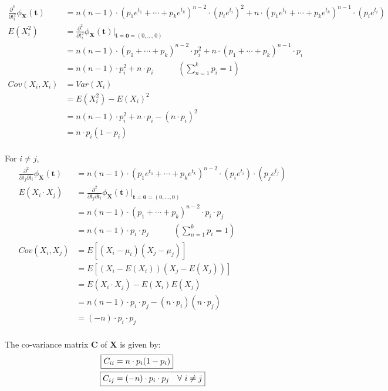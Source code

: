 \documentclass[11pt, fleqn]{article}
\begin{document}
\begin{equation*}
    \begin{split}
        \frac{\partial^2}{\partial t_i^2} \phi_{\mathbf{X}}(\mathbf{t}) &= n(n-1) \cdot (p_1 e^{t_1} + \cdots + p_k e^{t_k})^{n-2} \cdot (p_i e^{t_i})^2 + n \cdot (p_1 e^{t_1} + \cdots + p_k e^{t_k})^{n-1} \cdot (p_i e^{t_i}) \\
        E(X_i^2) &= \frac{\partial^2}{\partial t_i^2} \phi_{\mathbf{X}}(\mathbf{t}) \bigg\rvert_{\mathbf{t} = \mathbf{0} = (0, \dots, 0)} \\
            &= n(n-1) \cdot (p_1 + \cdots + p_k)^{n-2} \cdot p_i^2 + n \cdot (p_1 + \cdots + p_k)^{n-1} \cdot p_i \\
            &= n(n-1) \cdot p_i^2 + n \cdot p_i \hspace{3em} (\sum_{n=1}^{k} p_i = 1) \\
        Cov(X_i, X_i) &= Var(X_i) \\
            &= E(X_i^2) - E(X_i)^2 \\
            &= n(n-1) \cdot p_i^2 + n \cdot p_i - (n \cdot p_i)^2 \\
            &= n \cdot p_i (1 - p_i) \\
    \end{split}
\end{equation*}

For $i \ne j$,
\begin{equation*}
    \begin{split}
        \frac{\partial^2}{\partial t_j \partial t_i} \phi_{\mathbf{X}}(\mathbf{t}) &= n(n-1) \cdot (p_1 e^{t_1} + \cdots + p_k e^{t_k})^{n-2} \cdot (p_i e^{t_i}) \cdot (p_j e^{t_j}) \\
        E(X_i \cdot X_j) &= \frac{\partial^2}{\partial t_j \partial t_i} \phi_{\mathbf{X}}(\mathbf{t}) \bigg\rvert_{\mathbf{t} = \mathbf{0} = (0, \dots, 0)} \\
            &= n(n-1) \cdot (p_1 + \cdots + p_k)^{n-2} \cdot p_i \cdot p_j \\
            &= n(n-1) \cdot p_i  \cdot p_j \hspace{3em} (\sum_{n=1}^{k} p_i = 1) \\
        Cov(X_i, X_j) &= E[(X_i - \mu_i)(X_j - \mu_j)] \\
            &= E[(X_i - E(X_i))(X_j - E(X_j))] \\
            &= E(X_i \cdot X_j) - E(X_i)E(X_j) \\
            &= n(n-1) \cdot p_i  \cdot p_j - (n \cdot p_i)(n \cdot p_j) \\
            &= (-n) \cdot p_i \cdot p_j  \\
    \end{split}
\end{equation*}

The co-variance matrix $\mathbf{C}$ of $\mathbf{X}$ is given by:
\begin{equation*}
    \begin{split}
        \Aboxed{C_{ii} &= n \cdot p_i (1 - p_i)} \\
        \Aboxed{C_{ij} &= (-n) \cdot p_i \cdot p_j \quad \forall \ i \ne j} \\
    \end{split}
\end{equation*}
\end{document}
